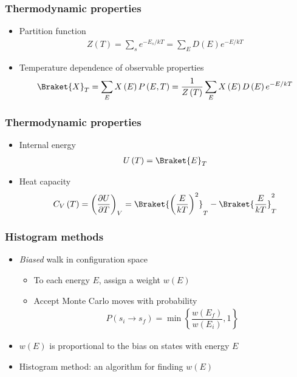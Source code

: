 \documentclass[xcolor=dvipsnames]{beamer}
\newcommand{\bk}{\Braket} %
\newcommand{\p}[1]{\left(#1\right)} %
\renewcommand{\set}[1]{\left\{#1\right\}} %
\newcommand{\f}[2]{\dfrac{#1}{#2}}
\renewcommand{\d}{\partial}
\let\olditem\item
\renewcommand{\item}{\setlength{\itemsep}{6pt}\olditem}
\begin{document}
\begin{frame}
  \frametitle{Thermodynamic properties}
  \begin{itemize}
  \item Partition function
    \begin{align*}
      Z\p{T}=\sum_se^{-E_s/kT}=\sum_ED\p{E}e^{-E/kT}
    \end{align*}

  \item Temperature dependence of observable properties
    \begin{align*}
      \bk{X}_T=\sum_EX\p{E}P\p{E,T}=\f1{Z\p{T}}\sum_EX\p{E}D\p{E}e^{-E/kT}
    \end{align*}
  \end{itemize}
\end{frame}

\begin{frame}
  \frametitle{Thermodynamic properties}
  \begin{itemize}
  \item Internal energy
    \begin{align*}
      U\p{T}=\bk{E}_T
    \end{align*}

  \item Heat capacity
    \begin{align*}
      C_V\p{T}=\p{\f{\d U}{\d T}}_V
      =\bk{\p{\f{E}{kT}}^2}_T-\bk{\f{E}{kT}}_T^2
    \end{align*}

  \end{itemize}
\end{frame}


\begin{frame}
  \frametitle{Histogram methods}
  \begin{itemize}
  \item {\it Biased} walk in configuration space
    \begin{itemize}
    \item<2-> To each energy $E$, assign a weight $w\p{E}$
    \item<2-> Accept Monte Carlo moves with probability
      \begin{align*}
        P\p{s_i\to s_f}=\min\set{\f{w\p{E_f}}{w\p{E_i}},1}
      \end{align*}
    \end{itemize}

  \item<3-> $w\p{E}$ is proportional to the bias on states with energy
    $E$
  \item<4> Histogram method: an algorithm for finding $w\p{E}$
  \end{itemize}
\end{frame}
\end{document}
